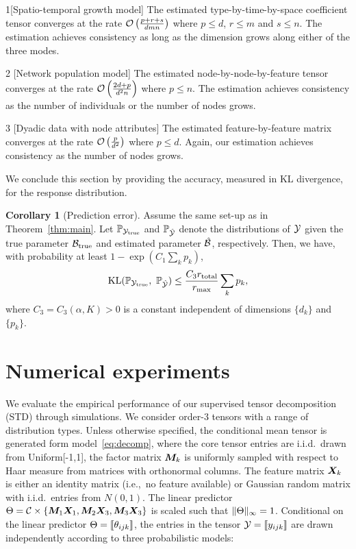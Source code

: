 \documentclass[12pt]{article}
\theoremstyle{definition}
\newtheorem{cor}{Corollary}[section]
\theoremstyle{definition}
\begin{document}
\begin{customexample}{1}[Spatio-temporal growth model] The estimated type-by-time-by-space coefficient tensor converges at the rate $\mathcal{O}\left(\frac{p+r+s}{dmn}\right)$ where $p\leq d$, $r\leq m$ and $s\leq n$. The estimation achieves consistency as long as the dimension grows along either of the three modes.
\end{customexample}

\begin{customexample}{2} [Network population model] The estimated node-by-node-by-feature tensor converges at the rate $\mathcal{O}\left(\frac{2d+p}{d^2n}\right)$ where $p\leq n$. The estimation achieves consistency as the number of individuals or the number of nodes grows. 
\end{customexample}

\begin{customexample}{3} [Dyadic data with node attributes] The estimated feature-by-feature matrix converges at the rate $\mathcal{O}\left(\frac{p}{d^2}\right)$ where $p\leq d$. Again, our estimation achieves consistency as the number of nodes grows. 
\end{customexample}

We conclude this section by providing the accuracy, measured in KL divergence, for the response distribution.   

\begin{cor}[Prediction error]\label{thm:KL}
Assume the same set-up as in Theorem~\ref{thm:main}. Let $\mathbb{P}_{\mathcal{Y}_{\textup{true}}}$ and $\mathbb{P}_{\hat {\mathcal{Y}}}$ denote the distributions of $\mathcal{Y}$ given the true parameter $\mathcal{B}_{\textup{true}}$ and estimated parameter $\hat {\mathcal{B}}$, respectively. Then, we have, with probability at least $1-\exp(C_1\sum_k p_k)$,
\[
\textup{KL}(\mathbb{P}_{\tY_{\textup{true}}},\ \mathbb{P}_{\hat \tY})\leq \frac{C_3r_{\textup{total}}}{r_{\max}}\sum_k p_k,
\]
where $C_3=C_3(\alpha, K)>0$ is a constant independent of dimensions $\{d_k\}$ and $\{p_k\}$.
\end{cor}

\section{Numerical experiments}\label{sec:simulation}
We evaluate the empirical performance of our supervised tensor decomposition (STD) through simulations. We consider order-3 tensors with a range of distribution types. Unless otherwise specified, the conditional mean tensor is generated form model~\eqref{eq:decomp}, where the core tensor entries are i.i.d.\ drawn from Uniform[-1,1], the factor matrix $\bm M_k$ is uniformly sampled with respect to Haar measure from matrices with orthonormal columns. The feature matrix $\bm X_k$ is either an identity matrix (i.e.,\ no feature  available) or Gaussian random matrix with i.i.d.\ entries from $N(0,1)$. The linear predictor $\Theta=\mathcal{C}\times\{\bm M_1\bm X_1,\bm M_2\bm X_3,\bm M_3\bm X_3\}$ is scaled such that $\lVert\Theta\rVert_\infty=1$. Conditional on the linear predictor $\Theta=\llbracket \theta_{ijk} \rrbracket$, the entries in the tensor $\mathcal{Y}=\llbracket y_{ijk} \rrbracket$ are drawn independently according to three probabilistic models:
\end{document}
